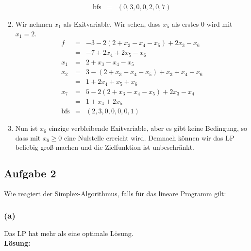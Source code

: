 \documentclass[11pt,a4paper,ngerman]{article}
\begin{document}
\begin{enumerate}[1.]
\begin{equation*}
\begin{array}{rcl}
            \text{bfs} & = & (0, 3, 0, 0, 2, 0, 7)
        \end{array}\end{equation*}
    \item Wir nehmen $x_1$ als Exitvariable. Wir sehen, dass $x_5$ als erstes $0$ wird
        mit $x_1 = 2$.\\
        \begin{equation*}\begin{array}{rcl}
            f   & = & -3 - 2 (2 + x_3 - x_4 - x_5) + 2x_3 - x_6\\
                & = & -7 + 2x_4 + 2x_5 - x_6\\
            x_1 & = & 2 + x_3 - x_4 - x_5\\
            x_2 & = & 3 - (2 + x_3 - x_4 - x_5) + x_3 + x_4 + x_6\\
                & = & 1 + 2x_4 + x_5 + x_6\\
            x_7 & = & 5 - 2 (2 + x_3 - x_4 - x_5) + 2x_3 - x_4\\
                & = & 1 + x_4 + 2x_5\\
            \text{bfs} & = & (2, 3, 0, 0, 0, 0, 1)
        \end{array}\end{equation*}
    \item Nun ist $x_6$ einzige verbleibende Exitvariable, aber es gibt keine Bedingung, so dass mit $x_6 \geq 0$ eine Nulstelle
        erreicht wird. Demnach können wir das LP beliebig groß machen und die Zielfunktion ist unbeschränkt.
\end{enumerate}

\subsection*{Aufgabe 2}

Wie reagiert der Simplex-Algorithmus, falls für das lineare Programm gilt:

\subsubsection*{(a)}
Das LP hat mehr als eine optimale Lösung.\\

\textbf{Lösung:}\\
\end{document}
